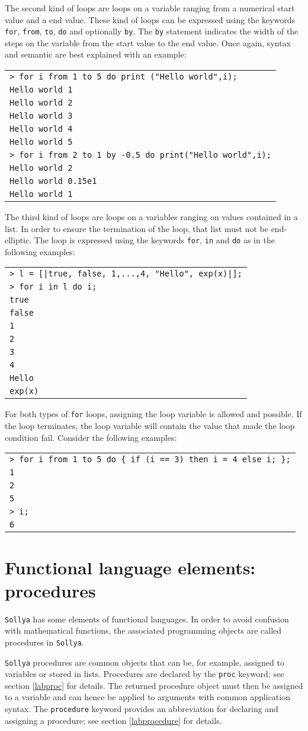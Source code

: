 \documentclass[a4paper]{article}
\newcommand{\key}[1]{\texttt{#1}}
\newcommand{\sollya}{\texttt{Sollya}\xspace}
\newcommand{\code}[1]{
\begin{center}
\begin{tabular}{|p{14.8cm}|}
\hline
#1
\hline
\end{tabular}
\end{center}
}
\newcommand{\ligne}[1]{\texttt{#1}\\}
\begin{document}
The second kind of loops are loops on a variable ranging from a
numerical start value and a end value. These kind of loops can be
expressed using the keywords \key{for}, \key{from}, \key{to}, \key{do}
and optionally \key{by}. The \key{by} statement indicates the width of
the steps on the variable from the start value to the end value. Once
again, syntax and semantic are best explained with an example:

\code{
\ligne{> for i from 1 to 5 do print ("Hello world",i);}
\ligne{Hello world 1}
\ligne{Hello world 2}
\ligne{Hello world 3}
\ligne{Hello world 4}
\ligne{Hello world 5}
\ligne{> for i from 2 to 1 by -0.5 do print("Hello world",i);}
\ligne{Hello world 2}
\ligne{Hello world 0.15e1}
\ligne{Hello world 1}
}

The third kind of loops are loops on a variables ranging on values
contained in a list. In order to ensure the termination of the loop,
that list must not be end-elliptic. The loop is expressed using the
keywords \key{for}, \key{in} and \key{do} as in the following
examples:

\code{
\ligne{> l = [|true, false, 1,...,4, "Hello", exp(x)|];}
\ligne{> for i in l do i;}
\ligne{true}
\ligne{false}
\ligne{1}
\ligne{2}
\ligne{3}
\ligne{4}
\ligne{Hello}
\ligne{exp(x)}
}

For both types of \key{for} loops, assigning the loop variable is
allowed and possible. If the loop terminates, the loop variable will
contain the value that made the loop condition fail. Consider the
following examples:

\code{
\ligne{> for i from 1 to 5 do \{ if (i == 3) then i = 4 else i; \};}
\ligne{1}
\ligne{2}
\ligne{5}
\ligne{> i;}
\ligne{6}
}

\section{Functional language elements: procedures}

\sollya has some elements of functional languages. In order to 
avoid confusion with mathematical functions, the associated 
programming objects are called procedures in \sollya. 

\sollya procedures are common objects that can be, for example,
assigned to variables or stored in lists. Procedures are declared by
the \key{proc} keyword; see section \ref{labproc} for details. The
returned procedure object must then be assigned to a variable and can
hence be applied to arguments with common application syntax. The
\key{procedure} keyword provides an abbreviation for declaring and
assigning a procedure; see section \ref{labprocedure} for details.
\end{document}
